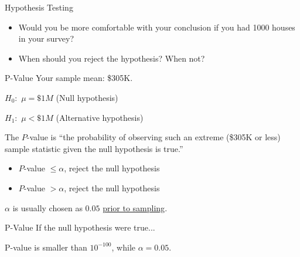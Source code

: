 \documentclass{beamer}\usepackage[]{graphicx}\usepackage[]{color}
\begin{document}
\begin{darkframes}
\begin{frame}[label=lists]{Hypothesis Testing}
\begin{itemize}
   \item Would you be more comfortable with your conclusion if you had 1000 houses in your survey?
    
   \item When should you reject the hypothesis? When not?
    
   \end{itemize}


	\end{frame}
	
	
	\begin{frame}[label=lists]{P-Value}
		Your sample mean: \$305K. 	\newline
	
		$H_0:$ $\mu=\$1M$	(Null hypothesis)
		
		$H_1:$ $\mu<\$1M$	(Alternative hypothesis) \newline
		
		
		
		The \alert{$P$-value} is ``the probability of observing such an extreme (\$305K or less) sample statistic given the null hypothesis is true.'' \newline
		
		\begin{itemize}
		\item $P$-value  $\leq \alpha$, reject the null hypothesis
		\item $P$-value  $> \alpha$, reject the null hypothesis
		
		\end{itemize}		
		
		
		$\alpha$ is usually chosen as $0.05$ \underline{prior to sampling}.		
		

	\end{frame}
	
	
	\begin{frame}[label=lists]{P-Value}
		If the null hypothesis were true...
		\begin{figure} 
				\centering
				\setlength\fboxsep{0pt}
				\setlength\fboxrule{0.2pt} 
		\end{figure} 			
		P-value is smaller than $10^{-100}$, while $\alpha=0.05$. 
		

\end{frame}
\end{darkframes}
\end{document}
